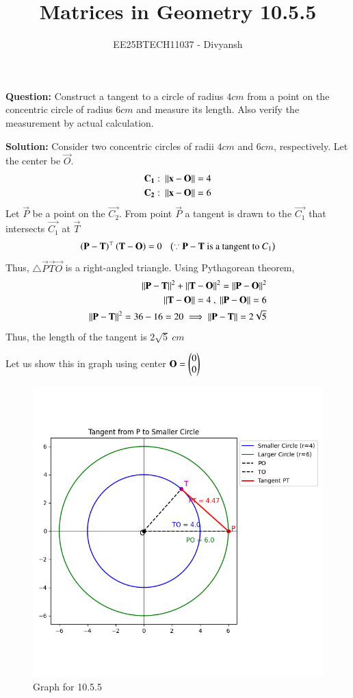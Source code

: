 \documentclass[journal,12pt,onecolumn]{IEEEtran}
\title{Matrices in Geometry 10.5.5}
\author{EE25BTECH11037 - Divyansh}
\theoremstyle{remark}
\begin{document}
\vspace{3cm}
\maketitle
{\let\newpage\relax\maketitle}
\textbf{Question: }
Construct a tangent to a circle of radius $4cm$ from a point on the concentric circle of radius $6cm$ and measure its length. Also verify the measurement by actual calculation.
\vspace{2mm}


\textbf{Solution:}
Consider two concentric circles of radii $4cm$ and $6cm$, respectively. Let the center be $\vec{O}$.
\begin{align}
    \mathbf{C_1}: \ \left\lVert\mathbf{x} - \mathbf{O}\right\rVert = 4 \\
    \mathbf{C_2}: \ \left\lVert\mathbf{x} - \mathbf{O}\right\rVert = 6 
\end{align}
Let $\vec{P}$ be a point on the $\vec{C_2}$. From point $\vec{P}$ a tangent is drawn to the $\vec{C_1}$ that intersects $\vec{C_1}$ at $\vec{T}$
\begin{align}
    \brak{\vec{P} - \vec{T}}^{\top} \brak{\vec{T} - \vec{O}} = 0 \ \ \ \brak{\because \text{$\vec{P}-\vec{T}$ is a tangent to $C_1$}}
\end{align}
Thus, $\triangle \vec{P}\vec{T}\vec{O}$ is a right-angled triangle. Using Pythagorean theorem, 
\begin{align}
    \left\lVert\mathbf{P} - \mathbf{T}\right\rVert^2 + \left\lVert\mathbf{T} - \mathbf{O}\right\rVert^2 = \left\lVert\mathbf{P} - \mathbf{O}\right\rVert^2 \\ 
    \left\lVert\mathbf{T} - \mathbf{O}\right\rVert=4 \ ,  \ \left\lVert\mathbf{P} - \mathbf{O}\right\rVert=6\\
    \left\lVert\mathbf{P} - \mathbf{T}\right\rVert^2 = 36-16 = 20 \implies \left\lVert\mathbf{P} - \mathbf{T}\right\rVert=2\sqrt{5}
\end{align}
Thus, the length of the tangent is $2\sqrt{5} \ cm $

Let us show this in graph using center $\mathbf{O}= \begin{pmatrix}0\\0\end{pmatrix}$
\begin{figure}
    \centering
    \includegraphics[width=1\columnwidth]{figs/1.png}
    \caption{Graph for 10.5.5}
    \label{fig:placeholder}
\end{figure}
\end{document}
